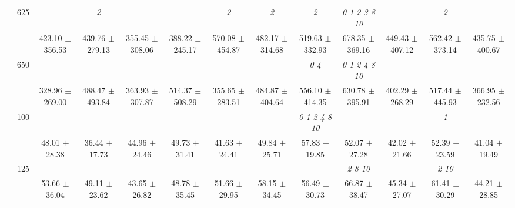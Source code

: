 \begin{table}[h]
{\begin{tabular}{
        ccccccccccccc}
 & \multirow{2}{*}{625}& \cellcolor[HTML]{EFEFEF} & \cellcolor[HTML]{EFEFEF} \textit{ 2 }& \cellcolor[HTML]{EFEFEF} & \cellcolor[HTML]{EFEFEF} & \cellcolor[HTML]{EFEFEF} \textit{ 2 }& \cellcolor[HTML]{EFEFEF} \textit{ 2 }& \cellcolor[HTML]{EFEFEF} \textit{ 2 }& \cellcolor[HTML]{EFEFEF} \textit{  0  1  2  3  8 10 }& \cellcolor[HTML]{EFEFEF} & \cellcolor[HTML]{EFEFEF} \textit{ 2 }& \cellcolor[HTML]{EFEFEF}  \\ 
 & & \cellcolor[HTML]{EFEFEF} 423.10 $\pm$ 356.53& \cellcolor[HTML]{EFEFEF} 439.76 $\pm$ 279.13& \cellcolor[HTML]{EFEFEF} 355.45 $\pm$ 308.06& \cellcolor[HTML]{EFEFEF} 388.22 $\pm$ 245.17& \cellcolor[HTML]{EFEFEF} 570.08 $\pm$ 454.87& \cellcolor[HTML]{EFEFEF} 482.17 $\pm$ 314.68& \cellcolor[HTML]{EFEFEF} 519.63 $\pm$ 332.93& \cellcolor[HTML]{EFEFEF} 678.35 $\pm$ 369.16& \cellcolor[HTML]{EFEFEF} 449.43 $\pm$ 407.12& \cellcolor[HTML]{EFEFEF} 562.42 $\pm$ 373.14& \cellcolor[HTML]{EFEFEF} 435.75 $\pm$ 400.67 \\ 
 & \multirow{2}{*}{650}& & & & & & & \textit{ 0 4 }& \textit{  0  1  2  4  8 10 }& & &  \\ 
 & & 328.96 $\pm$ 269.00& 488.47 $\pm$ 493.84& 363.93 $\pm$ 307.87& 514.37 $\pm$ 508.29& 355.65 $\pm$ 283.51& 484.87 $\pm$ 404.64& 556.10 $\pm$ 414.35& 630.78 $\pm$ 395.91& 402.29 $\pm$ 268.29& 517.44 $\pm$ 445.93& 366.95 $\pm$ 232.56 \\ \midrule 
 & \multirow{2}{*}{100}& & & & & & & \textit{  0  1  2  4  8 10 }& & & \textit{ 1 }&  \\ 
 & & 48.01 $\pm$ 28.38& 36.44 $\pm$ 17.73& 44.96 $\pm$ 24.46& 49.73 $\pm$ 31.41& 41.63 $\pm$ 24.41& 49.84 $\pm$ 25.71& 57.83 $\pm$ 19.85& 52.07 $\pm$ 27.28& 42.02 $\pm$ 21.66& 52.39 $\pm$ 23.59& 41.04 $\pm$ 19.49 \\ 
 & \multirow{2}{*}{125}& \cellcolor[HTML]{EFEFEF} & \cellcolor[HTML]{EFEFEF} & \cellcolor[HTML]{EFEFEF} & \cellcolor[HTML]{EFEFEF} & \cellcolor[HTML]{EFEFEF} & \cellcolor[HTML]{EFEFEF} & \cellcolor[HTML]{EFEFEF} & \cellcolor[HTML]{EFEFEF} \textit{  2  8 10 }& \cellcolor[HTML]{EFEFEF} & \cellcolor[HTML]{EFEFEF} \textit{  2 10 }& \cellcolor[HTML]{EFEFEF}  \\ 
 & & \cellcolor[HTML]{EFEFEF} 53.66 $\pm$ 36.04& \cellcolor[HTML]{EFEFEF} 49.11 $\pm$ 23.62& \cellcolor[HTML]{EFEFEF} 43.65 $\pm$ 26.82& \cellcolor[HTML]{EFEFEF} 48.78 $\pm$ 35.45& \cellcolor[HTML]{EFEFEF} 51.66 $\pm$ 29.95& \cellcolor[HTML]{EFEFEF} 58.15 $\pm$ 34.45& \cellcolor[HTML]{EFEFEF} 56.49 $\pm$ 30.73& \cellcolor[HTML]{EFEFEF} 66.87 $\pm$ 38.47& \cellcolor[HTML]{EFEFEF} 45.34 $\pm$ 27.07& \cellcolor[HTML]{EFEFEF} 61.41 $\pm$ 30.29& \cellcolor[HTML]{EFEFEF} 44.21 $\pm$ 28.85 \\ 

\end{tabular}}
\end{table}
